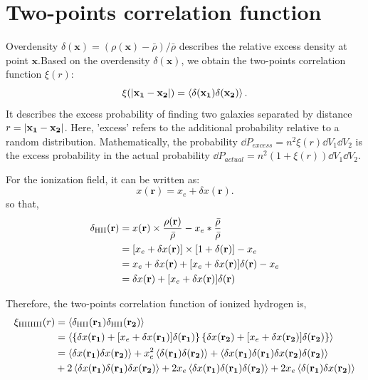 \section{Two-points correlation function}
	Overdensity $\delta(\mathbf{x}) = (\rho(\textbf{x})-\bar{\rho})/\bar{\rho}$ describes the relative excess density at point $\mathbf{x}$.Based on the overdensity $\delta(\textbf{x})$, we obtain the two-points correlation function $\xi(r)$:
	\begin{equation}
		\xi(\abs{\mathbf{x_1}-\mathbf{x_2}}) 
		=
		\left<
			\delta(\mathbf{x_1})\delta(\mathbf{x_2})
		\right>.
	\end{equation}
	It describes the excess probability of finding two galaxies separated by distance $r=\abs{\mathbf{x_1}-\mathbf{x_2}}$. Here, 'excess' refers to the additional probability relative to a random distribution. Mathematically, the probability $\dd{P_{excess}} = n^2\xi(r)\dd{V_1}\dd{V_2}$ is the excess probability in the actual probability $\dd{P_{actual}} = n^2(1+\xi(r))\dd{V_1}\dd{V_2}$.
	
	For the ionization field, it can be written as:
	\[
		x(\mathbf{r}) = x_e + \delta x(\mathbf{r}).
	\]
	so that,
	\begin{align}
		\delta_{\text{HII}}(\mathbf{r}) &= x(\mathbf{r})\times\dfrac{\rho(\mathbf{r})}{\bar{\rho}}-x_e*\dfrac{\bar{\rho}}{\bar{\rho}}
		\notag\\
		&= 
		[x_e + \delta x(\mathbf{r})]\times[1+\delta(\mathbf{r})]-x_e
		\notag\\
		&=
		x_e + \delta x(\mathbf{r}) + [x_e + \delta x(\mathbf{r})]\delta(\mathbf{r})-x_e
		\notag\\
		&=
		\delta x(\mathbf{r}) + [x_e + \delta x(\mathbf{r})]\delta(\mathbf{r})
	\end{align}
	
	Therefore, the two-points correlation function of ionized hydrogen is,
	\begin{align}
		\xi_{\text{HII}\text{HII}}(r) &= \left<
			\delta_{\text{HII}}(\mathbf{r_1})\delta_{\text{HII}}(\mathbf{r_2})
		\right>
		\notag\\
		&=
		\left<
			\left\lbrace
			\delta x(\mathbf{r_1}) + [x_e + \delta x(\mathbf{r_1})]\delta(\mathbf{r_1})
			\right\rbrace\left\lbrace
			\delta x(\mathbf{r_2}) + [x_e + \delta x(\mathbf{r_2})]\delta(\mathbf{r_2})
			\right\rbrace
		\right>
		\notag\\
		&=
		\left<
			\delta x(\mathbf{r_1})\delta x(\mathbf{r_2})
		\right>
		+x_e^2
		\left<
			\delta(\mathbf{r_1})\delta(\mathbf{r_2})
		\right>
		+\left<
			\delta x(\mathbf{r_1})\delta(\mathbf{r_1})\delta x(\mathbf{r_2})\delta(\mathbf{r_2})
		\right>
		\notag\\
		&+
		2\left<
			\delta x(\mathbf{r_1})\delta(\mathbf{r_1})\delta x(\mathbf{r_2})
		\right>
		+2x_e\left<
		\delta x(\mathbf{r_1})\delta(\mathbf{r_1})\delta (\mathbf{r_2})
		\right>
		+2x_e\left<
		\delta(\mathbf{r_1})\delta x(\mathbf{r_2})
		\right>
	\end{align}

